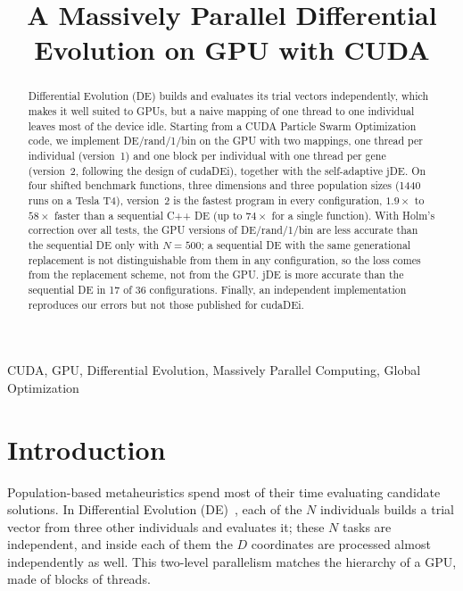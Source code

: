 \documentclass[conference]{IEEEtran}
\begin{document}
\title{A Massively Parallel Differential Evolution on GPU with CUDA}

\author{
}

\maketitle

\begin{abstract}
Differential Evolution (DE) builds and evaluates its trial vectors independently, which
makes it well suited to GPUs, but a naive mapping of one thread to one individual leaves
most of the device idle. Starting from a CUDA Particle Swarm Optimization code, we
implement DE/rand/1/bin on the GPU with two mappings, one thread per individual
(version~1) and one block per individual with one thread per gene (version~2, following
the design of cudaDEi), together with the self-adaptive jDE. On four shifted benchmark
functions, three dimensions and three population sizes (1440 runs on a Tesla T4), version~2
is the fastest program in every configuration, $1.9\times$ to $58\times$ faster than a
sequential C++ DE (up to $74\times$ for a single function). With Holm's correction over all
tests, the GPU versions of DE/rand/1/bin are less accurate than the sequential DE only with
$N=500$; a sequential DE with the same generational replacement is not distinguishable from
them in any configuration, so the loss comes from the replacement scheme, not from the GPU.
jDE is more accurate than the sequential DE in 17 of 36 configurations. Finally, an
independent implementation reproduces our errors but not those published for cudaDEi.
\end{abstract}

\begin{IEEEkeywords}
CUDA, GPU, Differential Evolution, Massively Parallel Computing, Global Optimization
\end{IEEEkeywords}

\section{Introduction}
Population-based metaheuristics spend most of their time evaluating candidate solutions.
In Differential Evolution (DE)~\cite{storn1997}, each of the $N$ individuals builds a trial
vector from three other individuals and evaluates it; these $N$ tasks are independent, and
inside each of them the $D$ coordinates are processed almost independently as well. This
two-level parallelism matches the hierarchy of a GPU, made of blocks of threads.
\end{document}
